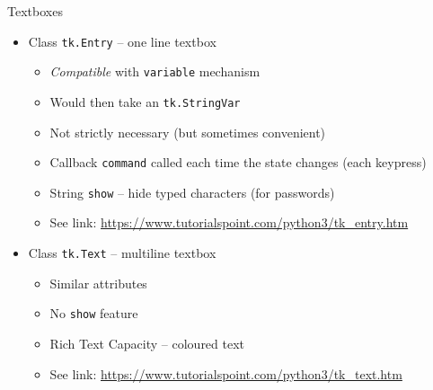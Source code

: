 \begin{frame}[fragile]{Textboxes}
%
%
\begin{itemize}
\item Class \texttt{tk.Entry} -- one line textbox
	\begin{itemize}
	\item \emph{Compatible} with \texttt{variable} mechanism
	\item Would then take an \texttt{tk.StringVar}
	\item Not strictly necessary (but sometimes convenient)
	\item Callback \texttt{command} called each time the state changes (each keypress)
	\item String \texttt{show} -- hide typed characters (for passwords)
	\item See link: {\scriptsize \url{https://www.tutorialspoint.com/python3/tk_entry.htm}}
	\end{itemize}
\item Class \texttt{tk.Text} -- multiline textbox
	\begin{itemize}
	\item Similar attributes
	\item No \texttt{show} feature
	\item Rich Text Capacity -- \eg coloured text
	\item See link: {\scriptsize \url{https://www.tutorialspoint.com/python3/tk_text.htm}}
	\end{itemize}
\end{itemize}
%
\end{frame}


